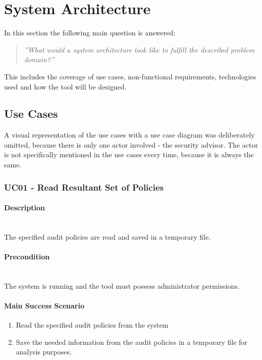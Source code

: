 \section{System Architecture}
In this section the following main question is answered: 
\begin{quotation}
    \textit{''What would a system architecture look like to fulfill the described problem domain?''}
\end{quotation}
This includes the coverage of use cases, non-functional requirements, technologies used and how the tool will be designed.

\subsection{Use Cases}
A visual representation of the use cases with a use case diagram was deliberately omitted, because there is only one actor involved - the security advisor. The actor is not specifically mentioned in the use cases every time, because it is always the same.

\subsubsection{UC01 - Read Resultant Set of Policies}\label{UC01}
\begin{tcolorbox}
    \paragraph{Description} \ \\
    The specified audit policies are read and saved in a temporary file.
    \ \\
    \paragraph{Precondition} \ \\
    The system is running and the tool must possess administrator permissions.
    \ \\
    \paragraph{Main Success Scenario} 
    \begin{enumerate}
        \item Read the specified audit policies from the system
        \item Save the needed information from the audit policies in a temporary file for analysis purposes.
    \end{enumerate}   
\end{tcolorbox}

